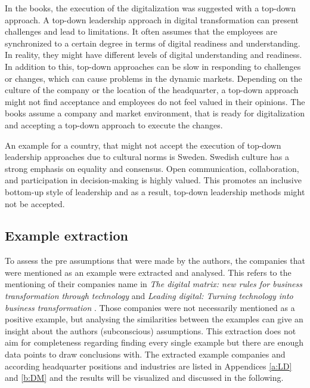 \documentclass[a4]{scrartcl}
\begin{document}
In the books, the execution of the digitalization was suggested with a top-down approach.
A top-down leadership approach in digital transformation can present challenges and lead to limitations. 
It often assumes that the employees are synchronized to a certain degree in terms of digital readiness and understanding. In reality, they might have different levels of digital understanding and readiness. In addition to this, top-down approaches can be slow in responding to challenges or changes, which can cause problems in the dynamic markets.
Depending on the culture of the company or the location of the headquarter, a top-down approach might not find acceptance and employees do not feel valued in their opinions.
The books assume a company and market environment, that is ready for digitalization and accepting a top-down approach to execute the changes. \cite{digitalmatrix, leadingdigital}

An example for a country, that might not accept the execution of top-down leadership approaches due to cultural norms is Sweden.
Swedish culture has a strong emphasis on equality and consensus. Open communication, collaboration, and participation in decision-making is highly valued. This promotes an inclusive bottom-up style of leadership and as a result, top-down leadership methods might not be accepted. \cite{lagom, nms}










\subsection{Example extraction} \label{subsec:examples}

To assess the pre assumptions that were made by the authors, the companies that were mentioned as an example were extracted and analysed. This refers to the mentioning of their companies name in \textit{The digital matrix: new rules for business transformation through technology} \cite{digitalmatrix} and \textit{Leading digital: Turning technology into business transformation} \cite{leadingdigital}. Those companies were not necessarily mentioned as a positive example, but analysing the similarities between the examples can give an insight about the authors (subconscious) assumptions.
This extraction does not aim for completeness regarding finding every single example but there are enough data points to draw conclusions with. The extracted example companies and according headquarter positions and industries are listed in Appendices \ref{a:LD} and \ref{b:DM} and the results will be visualized and discussed in the following.
\end{document}
